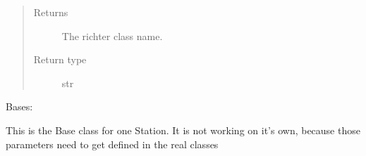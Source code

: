 \documentclass[letterpaper,10pt,english]{sphinxmanual}
\begin{document}
\begin{fulllineitems}
\begin{fulllineitems}
\begin{quote}
\begin{description}
\item[{Returns}] \leavevmode
\sphinxAtStartPar
The richter class name.

\item[{Return type}] \leavevmode
\sphinxAtStartPar
str

\end{description}\end{quote}

\end{fulllineitems}


\end{fulllineitems}


\begin{fulllineitems}
\label{\detokenize{weatherDB:weatherDB.station.StationBase}}
\sphinxAtStartPar
Bases: 

\sphinxAtStartPar
This is the Base class for one Station.
It is not working on it’s own, because those parameters need to get defined in the real classes

\begin{fulllineitems}
\label{\detokenize{weatherDB:weatherDB.station.StationBase.__init__}}
\end{fulllineitems}


\begin{fulllineitems}
\label{\detokenize{weatherDB:weatherDB.station.StationBase.download_raw}}
\end{fulllineitems}



\end{fulllineitems}
\end{document}
